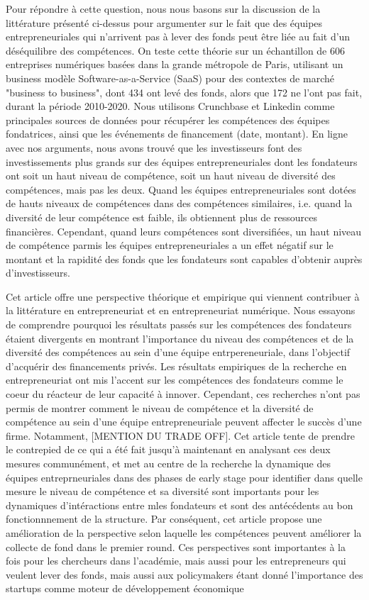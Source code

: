 \documentclass[11pt]{article}
\begin{document}
Pour répondre à cette question, nous nous basons sur la discussion de la littérature présenté ci-dessus pour argumenter sur le fait que des équipes entrepreneuriales qui n'arrivent pas à lever des fonds peut être liée au fait d'un déséquilibre des compétences. On teste cette théorie sur un échantillon de 606 entreprises numériques basées dans la grande métropole de Paris, utilisant un business modèle Software-as-a-Service (SaaS) pour des contextes de marché "business to business", dont 434 ont levé des fonds, alors que 172 ne l'ont pas fait, durant la période 2010-2020. Nous utilisons Crunchbase et Linkedin comme principales sources de données pour récupérer les compétences des équipes fondatrices, ainsi que les événements de financement (date, montant). En ligne avec nos arguments, nous avons trouvé que les investisseurs font des investissements plus grands sur des équipes entrepreneuriales dont les fondateurs ont soit un haut niveau de compétence, soit un haut niveau de diversité des compétences, mais pas les deux. Quand les équipes entrepreneuriales sont dotées de hauts niveaux de compétences dans des compétences similaires, i.e. quand la diversité de leur compétence est faible, ils obtiennent plus de ressources financières. Cependant, quand leurs compétences sont diversifiées, un haut niveau de compétence parmis les équipes entrepreneuriales a un effet négatif sur le montant et la rapidité des fonds que les fondateurs sont capables d'obtenir auprès d'investisseurs.

Cet article offre une perspective théorique et empirique qui viennent contribuer à la littérature en entrepreneuriat et en entrepreneuriat numérique. Nous essayons de comprendre pourquoi les résultats passés sur les compétences des fondateurs étaient divergents en montrant l'importance du niveau des compétences et de la diversité des compétences au sein d'une équipe entrpereneuriale, dans l'objectif d'acquérir des financements privés. Les résultats empiriques de la recherche en entrepreneuriat ont mis l'accent sur les compétences des fondateurs comme le coeur du réacteur de leur capacité à innover. Cependant, ces recherches n'ont pas permis de montrer comment le niveau de compétence et la diversité de compétence au sein d'une équipe entrepreneuriale peuvent affecter le succès d'une firme. Notamment, [MENTION DU TRADE OFF]. Cet article tente de prendre le contrepied de ce qui a été fait jusqu'à maintenant en analysant ces deux mesures communément, et met au centre de la recherche la dynamique des équipes entreprneuriales dans des phases de early stage pour identifier dans quelle mesure le niveau de compétence et sa diversité sont importants pour les dynamiques d'intéractions entre mles fondateurs et sont des antécédents au bon fonctionnnement de la structure. Par conséquent, cet article propose une amélioration de la perspective selon laquelle les compétences peuvent améliorer la collecte de fond dans le premier round. Ces perspectives sont importantes à la fois pour les chercheurs dans l'académie, mais aussi pour les entrepreneurs qui veulent lever des fonds, mais aussi aux policymakers étant donné l'importance des startups comme moteur de développement économique
\end{document}
